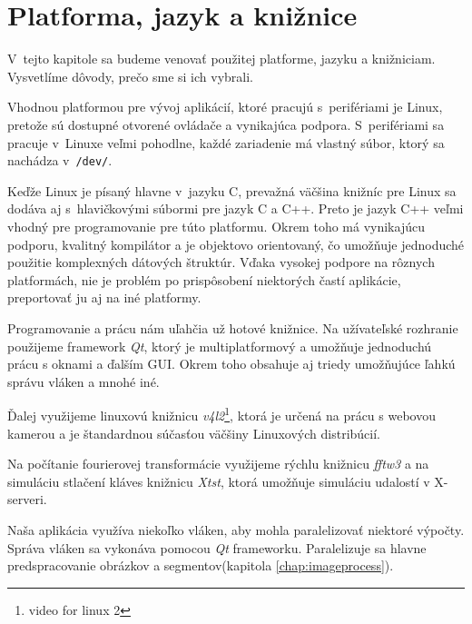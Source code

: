 \chapter{Platforma, jazyk a knižnice}

V~tejto kapitole sa budeme venovať použitej platforme, jazyku a knižniciam. Vysvetlíme dôvody, prečo sme si ich vybrali.
\bigskip

Vhodnou platformou pre vývoj aplikácií, ktoré pracujú s~perifériami je Linux, pretože sú dostupné otvorené ovládače a vynikajúca podpora. S~perifériami sa pracuje v~Linuxe veľmi pohodlne, každé zariadenie má vlastný súbor, ktorý sa nachádza v~{\tt /dev/}.

Keďže Linux je písaný hlavne v~jazyku C, prevažná väčšina knižníc pre Linux sa dodáva aj s~hlavičkovými súbormi pre jazyk C a C++.
Preto je jazyk C++ veľmi vhodný pre programovanie pre túto platformu. Okrem toho má vynikajúcu podporu, kvalitný kompilátor a je objektovo orientovaný, čo umožňuje jednoduché použitie komplexných dátových štruktúr. Vďaka vysokej podpore na rôznych platformách, nie je problém po prispôsobení niektorých častí aplikácie, preportovať ju aj na iné platformy.

Programovanie a prácu nám uľahčia už hotové knižnice. Na užívateľské rozhranie použijeme framework \textit{Qt}, ktorý je multiplatformový a umožňuje jednoduchú prácu s oknami a ďalším GUI. Okrem toho obsahuje aj triedy umožňujúce ľahkú správu vláken a mnohé iné.

Ďalej využijeme linuxovú knižnicu \textit{v4l2}\footnote{video for linux 2}, ktorá je určená na prácu s webovou kamerou a je štandardnou súčasťou väčšiny Linuxových distribúcií.

Na počítanie fourierovej transformácie využijeme rýchlu knižnicu \textit{fftw3} a na simuláciu stlačení kláves knižnicu \textit{Xtst}, ktorá umožňuje simuláciu udalostí v X-serveri.

Naša aplikácia využíva niekoľko vláken, aby mohla paralelizovať niektoré výpočty. Správa vláken sa vykonáva pomocou \textit{Qt} frameworku. Paralelizuje sa hlavne predspracovanie obrázkov a segmentov(kapitola \ref{chap:imageprocess}).


